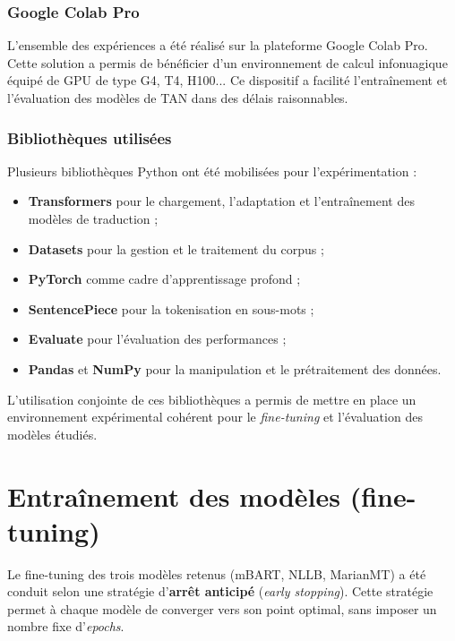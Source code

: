 \subsubsection{Google Colab Pro}

L'ensemble des expériences a été réalisé sur la plateforme Google Colab Pro. Cette solution a permis de bénéficier d'un environnement de calcul infonuagique équipé de \ac{GPU} de type G4, T4, H100... Ce dispositif a facilité l'entraînement et l'évaluation des modèles de \ac{TAN} dans des délais raisonnables.

\subsubsection{Bibliothèques utilisées}

Plusieurs bibliothèques Python ont été mobilisées pour l'expérimentation :

\begin{itemize}
    \item \textbf{Transformers} pour le chargement, l'adaptation et l'entraînement des modèles de traduction ;
    \item \textbf{Datasets} pour la gestion et le traitement du corpus ;
    \item \textbf{PyTorch} comme cadre d'apprentissage profond ;
    \item \textbf{\ac{SentencePiece}} pour la tokenisation en sous-mots ;
    \item \textbf{Evaluate} pour l'évaluation des performances ;
    \item \textbf{Pandas} et \textbf{NumPy} pour la manipulation et le prétraitement des données.
\end{itemize}

L'utilisation conjointe de ces bibliothèques a permis de mettre en place un environnement expérimental cohérent pour le \textit{fine-tuning} et l'évaluation des modèles étudiés.

\section{Entraînement des modèles (fine-tuning)}
\label{sec:entrainement_finetuning}

Le fine-tuning des trois modèles retenus (\ac{mBART}, \ac{NLLB}, \ac{MarianMT}) a été conduit selon une stratégie d'\textbf{arrêt anticipé} (\textit{early stopping}). Cette stratégie permet à chaque modèle de converger vers son point optimal, sans imposer un nombre fixe d'\textit{epochs}.

